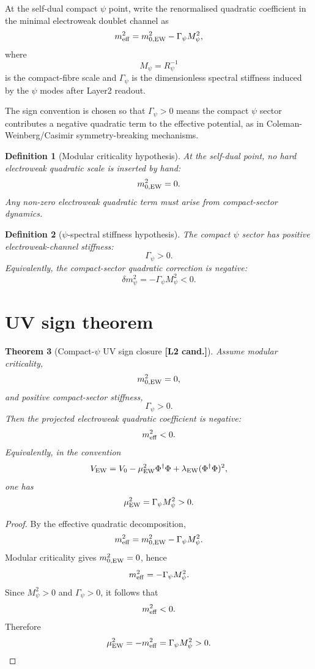 \documentclass[12pt,a4paper]{article}
\newtheorem{definition}{Definition}[section]
\newtheorem{theorem}[definition]{Theorem}
\newcommand{\Ltwo}{\textbf{[L2 cand.]}}
\begin{document}
At the self-dual compact $\psi$ point, write the renormalised quadratic
coefficient in the minimal electroweak doublet channel as
\[
  m_{\rm eff}^2
  =m_{0,\rm EW}^2-\Gamma_{\psi}M_{\psi}^2,
\]
where
\[
  M_{\psi}=R_{\psi}^{-1}
\]
is the compact-fibre scale and $\Gamma_{\psi}$ is the dimensionless spectral
stiffness induced by the $\psi$ modes after Layer2 readout.

The sign convention is chosen so that $\Gamma_{\psi}>0$ means the compact
$\psi$ sector contributes a negative quadratic term to the effective potential,
as in Coleman-Weinberg/Casimir symmetry-breaking mechanisms.

\begin{definition}[Modular criticality hypothesis]
At the self-dual point, no hard electroweak quadratic scale is inserted by hand:
\[
  m_{0,\rm EW}^2=0.
\]
Any non-zero electroweak quadratic term must arise from compact-sector dynamics.
\end{definition}

\begin{definition}[$\psi$-spectral stiffness hypothesis]
The compact $\psi$ sector has positive electroweak-channel stiffness:
\[
  \Gamma_{\psi}>0.
\]
Equivalently, the compact-sector quadratic correction is negative:
\[
  \delta m_{\psi}^2=-\Gamma_{\psi}M_{\psi}^2<0.
\]
\end{definition}

\section{UV sign theorem}

\begin{theorem}[Compact-$\psi$ UV sign closure \Ltwo]
Assume modular criticality,
\[
  m_{0,\rm EW}^2=0,
\]
and positive compact-sector stiffness,
\[
  \Gamma_{\psi}>0.
\]
Then the projected electroweak quadratic coefficient is negative:
\[
  m_{\rm eff}^2<0.
\]
Equivalently, in the convention
\[
  V_{\rm EW}=V_0-\mu_{\rm EW}^2\Phi^\dagger\Phi
  +\lambda_{\rm EW}(\Phi^\dagger\Phi)^2,
\]
one has
\[
  \mu_{\rm EW}^2=\Gamma_{\psi}M_{\psi}^2>0.
\]
\end{theorem}

\begin{proof}
By the effective quadratic decomposition,
\[
  m_{\rm eff}^2
  =m_{0,\rm EW}^2-\Gamma_{\psi}M_{\psi}^2.
\]
Modular criticality gives $m_{0,\rm EW}^2=0$, hence
\[
  m_{\rm eff}^2=-\Gamma_{\psi}M_{\psi}^2.
\]
Since $M_{\psi}^2>0$ and $\Gamma_{\psi}>0$, it follows that
\[
  m_{\rm eff}^2<0.
\]
Therefore
\[
  \mu_{\rm EW}^2=-m_{\rm eff}^2=\Gamma_{\psi}M_{\psi}^2>0.
\]
\end{proof}
\end{document}
